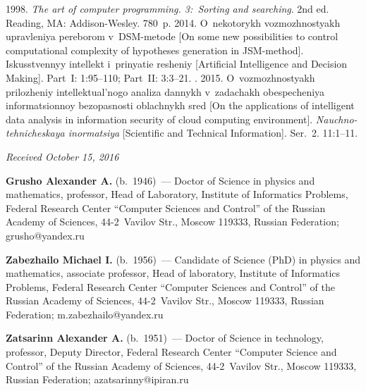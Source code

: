 \begin{multicols}{2}
{{\begin{thebibliography}{9}
  1998. \textit{The art of computer programming. 3:~Sorting and searching}. 
  2nd ed. Reading, MA: Addison-Wesley. 780~p.
   2014. O~nekotorykh vozmozhnostyakh upravleniya 
pereborom v~DSM-metode [On some new possibilities to control computational 
complexity of hypotheses generation in JSM-method].  Iskusstvennyy intellekt 
i~prinyatie resheniy [Artificial Intelligence and Decision Making]. Part~I:  
1:95--110; Part~II: 3:3--21.
  . 2015. O~vozmozhnostyakh prilozheniy intellektual'nogo 
analiza dannykh v~zadachakh obespecheniya informatsionnoy bez\-opas\-nosti 
oblachnykh sred [On the applications of intelligent data analysis in information 
security of cloud computing environment]. \textit{Nauchno-tehnicheskaya 
inormatsiya}  [Scientific and Technical Information]. Ser.~2. 11:1--11. 
\end{thebibliography}

 }
 }

\end{multicols}

\vspace*{-9pt}

\hfill{\small\textit{Received October 15, 2016}}

\vspace*{-6pt}

\Contr

\noindent
\textbf{Grusho Alexander A.} (b.\ 1946)~--- Doctor of Science in physics and mathematics, professor, 
Head of Laboratory, Institute of Informatics Problems, Federal Research Center ``Computer Sciences 
and Control'' of the Russian Academy of Sciences, 44-2~Vavilov Str., Moscow 119333, Russian 
Federation; \mbox{grusho@yandex.ru} 

\vspace*{3pt}

\noindent
\textbf{Zabezhailo Michael I.} (b.\ 1956)~--- Candidate of Science (PhD) in physics and mathematics, 
associate professor, Head of laboratory, Institute of Informatics Problems, Federal Research Center 
``Computer Sciences and Control'' of the Russian Academy of Sciences, 44-2~Vavilov Str., Moscow 
119333, Russian Federation; \mbox{m.zabezhailo@yandex.ru} 

\vspace*{3pt}

\noindent
\textbf{Zatsarinn Alexander A.} (b.\ 1951)~--- Doctor of Science in technology, professor, Deputy 
Director, Federal Research Center ``Computer Science and Control'' of the Russian Academy of 
Sciences, 44-2~Vavilov Str., Moscow 119333, Russian Federation; \mbox{azatsarinny@ipiran.ru}

\label{end\stat}


\renewcommand{\bibname}{\protect\rm Литература} 